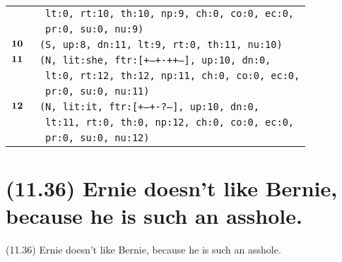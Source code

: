 \documentclass{article}
\begin{document}
\begin{minipage}{\textwidth}
{\begin{tabular}{|r|l|}
    & \texttt{\texttt{~lt:0,~rt:10,~th:10,~np:9,~ch:0,~co:0,~ec:0,}} \\
    & \texttt{\texttt{~pr:0,~su:0,~nu:9)}} \\
    ${\textbf{\textrm{10}}_{\phantom{z}}}$ & \texttt{\texttt{(S,~up:8,~dn:11,~lt:9,~rt:0,~th:11,~nu:10)}} \\
    ${\textbf{\textrm{11}}_{\phantom{z}}}$ & \texttt{\texttt{(N,~lit:she,~ftr:[+--+-++--],~up:10,~dn:0,}} \\
    & \texttt{\texttt{~lt:0,~rt:12,~th:12,~np:11,~ch:0,~co:0,~ec:0,}} \\
    & \texttt{\texttt{~pr:0,~su:0,~nu:11)}} \\
    ${\textbf{\textrm{12}}_{\phantom{z}}}$ & \texttt{\texttt{(N,~lit:it,~ftr:[+--+-?---],~up:10,~dn:0,}} \\
    & \texttt{\texttt{~lt:11,~rt:0,~th:0,~np:12,~ch:0,~co:0,~ec:0,}} \\
    & \texttt{\texttt{~pr:0,~su:0,~nu:12)}} \\
    \hline
  \end{tabular}
  }
\end{minipage}
\bigbreak

\clearpage

%
%

\section*{(11.36) Ernie doesn't like Bernie, because he is such an asshole.}

\bigbreak
\begin{enumerate*}
\item[(11.36)] Ernie doesn't like Bernie, because he is such an asshole.
\end{enumerate*}
\bigbreak
\end{document}
